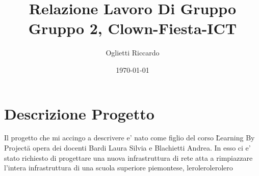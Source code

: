 \documentclass{report}
\author{Oglietti Riccardo}
\title{Relazione Lavoro Di Gruppo\\
\large Gruppo 2, Clown-Fiesta-ICT}
\date{\today}
\begin{document}
    \maketitle
    \chapter{Descrizione Progetto}
    Il progetto che mi accingo a descrivere e' nato come figlio del corso \"Learning By Project\" a opera dei docenti\nolinebreak
     Bardi Laura Silvia e Blachietti Andrea. In esso ci e' stato richiesto di progettare una nuova infrastruttura di\nolinebreak
     rete atta a rimpiazzare l'intera infrastruttura di una scuola superiore piemontese, lerolerolerolero
\end{document}
